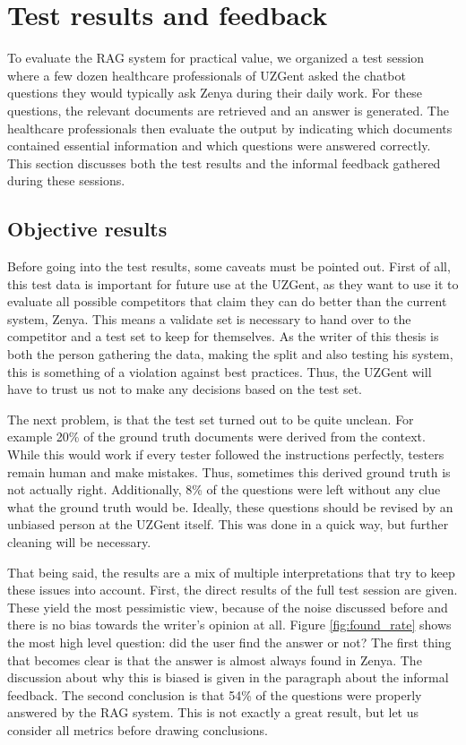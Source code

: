 \section{Test results and feedback}
\label{sec:uzgent_test_results_and_feedback}
To evaluate the RAG system for practical value, we organized a test session where a few dozen healthcare professionals of UZGent asked the chatbot questions they would typically ask Zenya during their daily work. For these questions, the relevant documents are retrieved and an answer is generated. The healthcare professionals then evaluate the output by indicating which documents contained essential information and which questions were answered correctly. This section discusses both the test results and the informal feedback gathered during these sessions.

\subsection{Objective results}
Before going into the test results, some caveats must be pointed out. First of all, this test data is important for future use at the UZGent, as they want to use it to evaluate all possible competitors that claim they can do better than the current system, Zenya. This means a validate set is necessary to hand over to the competitor and a test set to keep for themselves. As the writer of this thesis is both the person gathering the data, making the split and also testing his system, this is something of a violation against best practices. Thus, the UZGent will have to trust us not to make any decisions based on the test set.

The next problem, is that the test set turned out to be quite unclean. For example 20\% of the ground truth documents were derived from the context. While this would work if every tester followed the instructions perfectly, testers remain human and make mistakes. Thus, sometimes this derived ground truth is not actually right. Additionally, 8\% of the questions were left without any clue what the ground truth would be. Ideally, these questions should be revised by an unbiased person at the UZGent itself. This was done in a quick way, but further cleaning will be necessary.

That being said, the results are a mix of multiple interpretations that try to keep these issues into account. First, the direct results of the full test session are given. These yield the most pessimistic view, because of the noise discussed before and there is no bias towards the writer's opinion at all. Figure \ref{fig:found_rate} shows the most high level question: did the user find the answer or not? The first thing that becomes clear is that the answer is almost always found in Zenya. The discussion about why this is biased is given in the paragraph about the informal feedback. The second conclusion is that 54\% of the questions were properly answered by the RAG system. This is not exactly a great result, but let us consider all metrics before drawing conclusions. 

